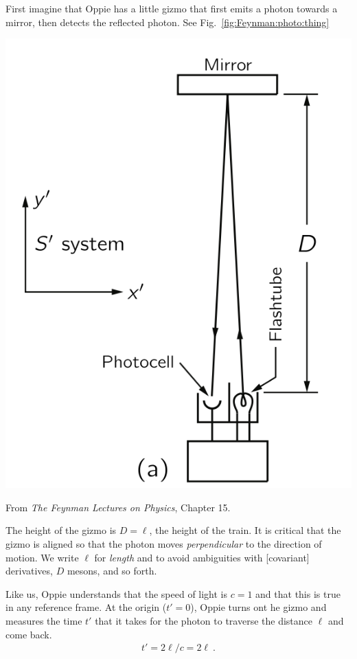 \documentclass[12pt, oneside]{report}    %
\begin{document}
\begin{subappendices}
First imagine that Oppie has a little gizmo that first emits a photon towards a mirror, then detects the reflected photon. See Fig.~\ref{fig:Feynman:photo:thing}
\begin{marginfigure}%
    \includegraphics[width=.8\textwidth]{figures/FeynmanLec15_photodet.png}
    \caption{From \emph{The Feynman Lectures on Physics}, Chapter 15.}
    \label{fig:Feynman:photo:thing}
\end{marginfigure}
The height of the gizmo is $D = \ell$, the height of the train. It is critical that the gizmo is aligned so that the photon moves \emph{perpendicular} to the direction of motion. We write $\ell$ for \emph{length} and to avoid ambiguities with [covariant] derivatives, $D$ mesons, and so forth. 

Like us, Oppie understands that the speed of light is $c=1$ and that this is true in any reference frame. At the origin ($t'=0$), Oppie turns ont he gizmo and measures the time $t'$ that it takes for the photon to traverse the distance $\ell$ and come back. 
\begin{align}
     t' = 2\ell/c = 2\ell \ .
     \label{eq:Feynman:train:updown}
\end{align}


\end{subappendices}
\end{document}
